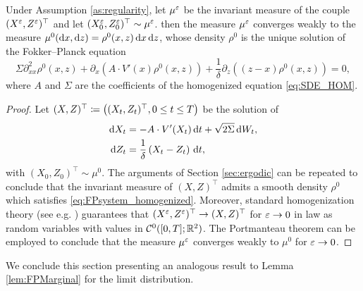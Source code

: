 \documentclass[10pt]{article}
\begin{document}
\begin{lemma}\label{lem:convMeasure} Under Assumption \ref{as:regularity}, let $\mu^\varepsilon$ be the invariant measure of the couple $(X^\varepsilon, Z^\varepsilon)^\top$ and let $(X_0^\varepsilon, Z_0^\varepsilon)^\top \sim \mu^\varepsilon$.  then the measure $\mu^\varepsilon$ converges weakly to the measure $\mu^0(\mathrm{d} x, \mathrm{d} z) = \rho^0(x, z) \,\mathrm{d} x \,\mathrm{d} z$, whose density $\rho^0$ is the unique solution of the Fokker--Planck equation
\begin{equation} \label{eq:FPsystem_homogenized}
	\Sigma \partial^2_{xx} \rho^0(x,z) + \partial_x\left( A \cdot V'(x) \rho^0(x,z) \right) + \frac{1}{\delta}\partial_z\left((z - x) \rho^0(x,z) \right) = 0,
\end{equation}
where $A$ and $\Sigma$ are the coefficients of the homogenized equation \eqref{eq:SDE_HOM}.
\end{lemma}

\begin{proof} Let $(X, Z)^\top \coloneqq \left((X_t, Z_t)^\top, 0\leq t \leq T\right)$ be the solution of
	\begin{equation}
	\label{eq:systemSDEHom}
	\begin{aligned}
	\mathrm{d} X_t &= -A \cdot V'(X_t) \,\mathrm{d} t + \sqrt{2\Sigma} \,\mathrm{d} W_t, \\
	\mathrm{d} Z_t &= \frac{1}{\delta} \left ( X_t - Z_t \right ) \,\mathrm{d} t,
	\end{aligned}
	\end{equation} 
	with $(X_0, Z_0)^\top \sim \mu^0$. The arguments of Section \ref{sec:ergodic} can be repeated to conclude that the invariant measure of $(X, Z)^\top$ admits a smooth density $\rho^0$ which satisfies \eqref{eq:FPsystem_homogenized}. Moreover, standard homogenization theory (see e.g. \cite[Chapter 3]{BLP78}) guarantees that $(X^\varepsilon,Z^\varepsilon)^\top \to (X,Z)^\top$ for $\varepsilon \to 0$ in law as random variables with values in $\mathcal C^0([0, T]; \mathbb{R}^2)$. The Portmanteau theorem can be employed to conclude that the measure $\mu^\varepsilon$ converges weakly to $\mu^0$ for $\varepsilon \to 0$.
\end{proof}


We conclude this section presenting an analogous result to Lemma \ref{lem:FPMarginal} for the limit distribution.
\end{document}
